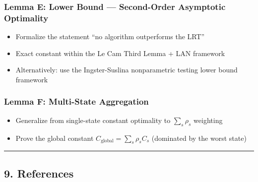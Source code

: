 \documentclass[
  12pt,
]{ctexart}
\providecommand{\tightlist}{%
  \setlength{\itemsep}{0pt}\setlength{\parskip}{0pt}}
\begin{document}
\subsubsection{Lemma E: Lower Bound --- Second-Order Asymptotic Optimality}\label{lemma-e-lower-bound-second-order-asymptotic-optimality}

\begin{itemize}
\tightlist
\item
  Formalize the statement ``no algorithm outperforms the LRT''
\item
  Exact constant within the Le Cam Third Lemma + LAN framework
\item
  Alternatively: use the Ingster-Suslina nonparametric testing lower bound framework
\end{itemize}

\subsubsection{Lemma F: Multi-State Aggregation}\label{lemma-f-multi-state-aggregation}

\begin{itemize}
\tightlist
\item
  Generalize from single-state constant optimality to \(\sum_s \rho_s\) weighting
\item
  Prove the global constant \(C_{\text{global}} = \sum_s \rho_s C_s\) (dominated by the worst state)
\end{itemize}

\begin{center}\rule{0.5\linewidth}{0.5pt}\end{center}

\subsection{9. References}\label{references}
\end{document}
